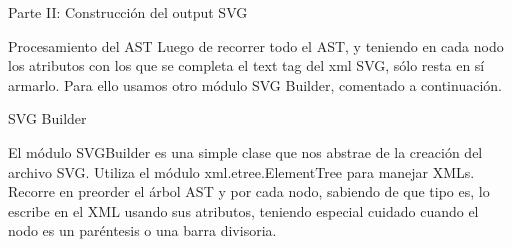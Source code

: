 \begin{section}{Parte II: Construcci\'on del output SVG}
\begin{subsection}{Procesamiento del AST}
Luego de recorrer todo el AST, y teniendo en cada nodo los atributos con los que se completa el text tag del xml SVG, s\'olo resta en s\'i armarlo. Para ello usamos otro m\'odulo SVG Builder, comentado a continuaci\'on.

\end{subsection}

\begin{subsection}{SVG Builder}

El m\'odulo SVGBuilder es una simple clase que nos abstrae de la creaci\'on del archivo SVG. Utiliza el m\'odulo xml.etree.ElementTree para manejar XMLs.
Recorre en preorder el \'arbol AST y por cada nodo, sabiendo de que tipo es, lo escribe en el XML usando sus atributos, teniendo especial cuidado cuando el nodo es un par\'entesis o una barra divisoria.
\end{subsection}

\end{section}

